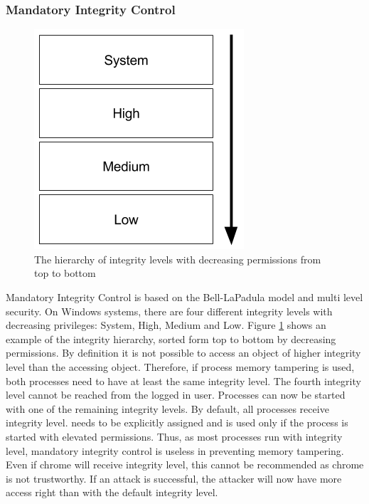 \subsubsection{Mandatory Integrity Control}
\begin{figure}[!htbp]
\centering
\includegraphics[scale=0.5]{sections/background/defenses/mic.png}
\caption{The hierarchy of integrity levels with decreasing permissions from top to bottom}
\label{fig:mic}
\end{figure}
Mandatory Integrity Control is based on the Bell-LaPadula \cite{eckert2014sicherheit} model and multi level security. On Windows systems, there are four different integrity levels with decreasing privileges: System, High, Medium and Low. Figure \ref{fig:mic} shows an example of the integrity hierarchy, sorted form top to bottom by decreasing permissions. By definition it is not possible to access an object of higher integrity level than the accessing object. Therefore, if process memory tampering is used, both processes need to have at least the same integrity level. The fourth integrity level  cannot be reached from the logged in user. Processes can now be started with one of the remaining integrity levels. By default, all processes receive  integrity level.  needs to be explicitly assigned and  is used only if the process is started with elevated permissions. Thus, as most processes run with  integrity level, mandatory integrity control is useless in preventing memory tampering. Even if chrome will receive  integrity level, this cannot be recommended as chrome is not trustworthy. If an attack is successful, the attacker will now have more access right than with the default  integrity level.